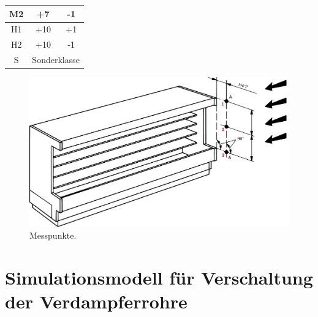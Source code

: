 \begin{table}[h!]
\begin{tabular}{|c|c|c|}
M2              & +7                                                                                                                         & -1                                                                                                                         \\ \hline
H1              & +10                                                                                                                        & +1                                                                                                                         \\ \hline
H2              & +10                                                                                                                        & -1                                                                                                                         \\ \hline
S               & \multicolumn{2}{c|}{Sonderklasse}                                                                                                                                                                                                                       \\ \hline
\end{tabular}
\end{table}




\begin{figure}[h!tb]
\centering
\includegraphics[scale=.5]{Pictures/idc_meas2.pdf}
\caption{Messpunkte.}
\label{fig:Messpunkte}
\end{figure}


\section{Simulationsmodell für Verschaltung der Verdampferrohre}
\label{sec:Simulationsmodell}

